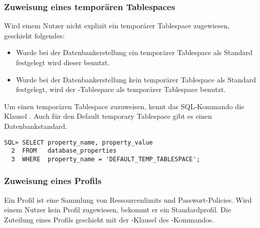         \subsubsection{Zuweisung eines temporären Tablespaces}
          Wird einem Nutzer nicht explizit ein temporärer Tablespace zugewiesen, geschieht folgendes:
          \begin{itemize}
            \item Wurde bei der Datenbankerstellung ein temporärer Tablespace als Standard festgelegt wird dieser benutzt.
            \item Wurde bei der Datenbankerstellung kein temporärer Tablespace als Standard festgelegt, wird der -Tablespace als temporärer Tablespace benutzt.
          \end{itemize}
          Um einen temporären Tablespace zuzuweisen, kennt das SQL-Kommando  die Klausel . Auch für den Default temporary Tablespace gibt es einen Datenbankstandard.
          \begin{lstlisting}[caption={Der Default Temporary
          Tablespace},label=admin202,language=oracle_sql]
SQL> SELECT property_name, property_value
  2  FROM   database_properties
  3  WHERE  property_name = 'DEFAULT_TEMP_TABLESPACE';
          \end{lstlisting}
        \subsubsection{Zuweisung eines Profils}
          Ein Profil ist eine Sammlung von Ressourcenlimits und Passwort-Policies. Wird einem Nutzer kein Profil zugewiesen, bekommt er ein Standardprofil. Die Zuteilung eines Profils geschieht mit der -Klausel des -Kommandos.

          \begin{literaturinternet}
            \item \cite{BABGIFFE}
          \end{literaturinternet}
